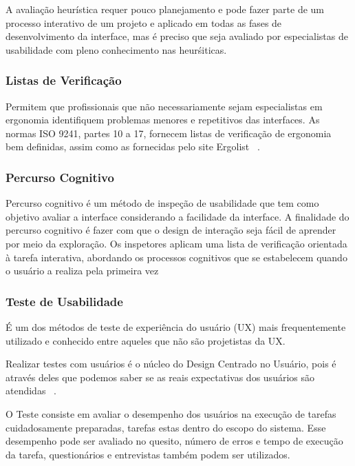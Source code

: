 	A avaliação heurística requer pouco planejamento e pode fazer parte de um processo interativo de um projeto e aplicado em todas as fases de desenvolvimento da interface, mas é preciso que seja avaliado por especialistas de usabilidade com pleno conhecimento nas heurśiticas.
	

\subsubsection{Listas de Verificação}

	Permitem que profissionais que não necessariamente sejam especialistas em ergonomia identifiquem problemas menores e repetitivos das interfaces. As normas ISO 9241, partes 10 a 17, fornecem listas de verificação de ergonomia bem definidas, assim como as fornecidas pelo site Ergolist ~\cite{cybis2010}.
	

\subsubsection{Percurso Cognitivo}

Percurso cognitivo é um método de inspeção de usabilidade que tem como objetivo avaliar a interface considerando a facilidade da interface. A finalidade do percurso cognitivo é fazer com que o design de interação seja fácil de aprender por meio da exploração. Os inspetores aplicam uma lista de verificação orientada à tarefa interativa, abordando os processos cognitivos que se estabelecem quando o usuário a realiza pela primeira vez ~\cite{cybis2010}


\subsubsection{Teste de Usabilidade}

	É um dos métodos de teste de experiência do usuário (UX) mais frequentemente utilizado e conhecido entre aqueles que não são projetistas da UX.

	Realizar testes com usuários é o núcleo do Design Centrado no Usuário, pois é através deles que podemos saber se as reais expectativas dos usuários são atendidas ~\cite{santos2012}.

	O Teste consiste em avaliar o desempenho dos usuários na execução de tarefas cuidadosamente preparadas, tarefas estas dentro do escopo do sistema. Esse desempenho pode ser avaliado no quesito, número de erros e tempo de execução da tarefa, questionários e entrevistas também podem ser utilizados. ~\cite{preece2007} %

